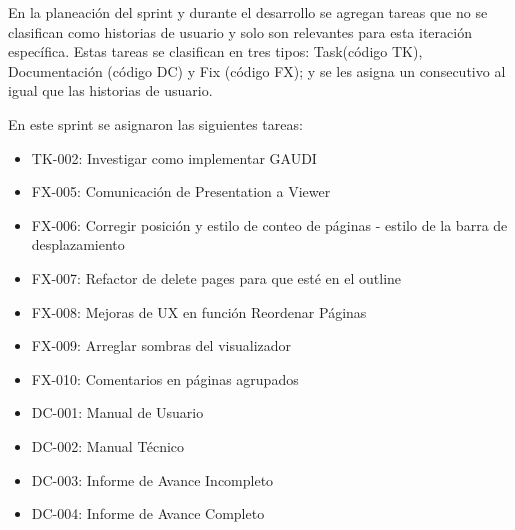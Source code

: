 En la planeación del sprint y durante el desarrollo se agregan tareas que no se clasifican como historias de usuario y solo son relevantes para esta iteración específica. Estas tareas se clasifican en tres tipos: Task(código TK), Documentación (código DC) y Fix (código FX); y se les asigna un consecutivo al igual que las historias de usuario.

En este sprint se asignaron las siguientes tareas:
\begin{itemize}
    \item TK-002: Investigar como implementar GAUDI
    \item FX-005: Comunicación de Presentation a Viewer
    \item FX-006: Corregir posición y estilo de conteo de páginas - estilo de la barra de desplazamiento
    \item FX-007: Refactor de delete pages para que esté en el outline
    \item FX-008: Mejoras de UX en función Reordenar Páginas
    \item FX-009: Arreglar sombras del visualizador
    \item FX-010: Comentarios en páginas agrupados
    \item DC-001: Manual de Usuario
    \item DC-002: Manual Técnico
    \item DC-003: Informe de Avance Incompleto
    \item DC-004: Informe de Avance Completo
\end{itemize}



